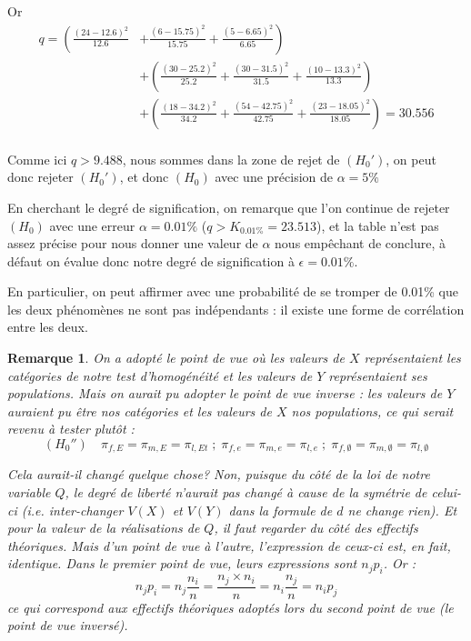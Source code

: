 \documentclass[a4paper,oneside,12pt]{article}
\theoremstyle{plain}
\newtheorem*{remark}{Remarque}
\begin{document}
\begin{enumerate}
    Or 
    \begin{align*}
        q = \left ( \frac{(24-12.6)^2}{12.6} \right. & +\left. \frac{(6-15.75)^2}{15.75}+\frac{(5-6.65)^2}{6.65} \right ) \\
        & + \left(\frac{(30-25.2)^2}{25.2}+\frac{(30-31.5)^2}{31.5}+\frac{(10-13.3)^2}{13.3}\right) \\
        & + \left(\frac{(18-34.2)^2}{34.2}+\frac{(54-42.75)^2}{42.75}+\frac{(23-18.05)^2}{18.05}\right)= 30.556\\
    \end{align*}


    Comme ici $q>9.488$, nous sommes dans la zone de rejet de $(H_0')$, on peut donc rejeter $(H_0')$, et donc $(H_0)$ avec une précision de $\alpha = 5\%$

    En cherchant le degré de signification, on remarque que l'on continue de rejeter $(H_0)$ avec une erreur $\alpha = 0.01\%$ ($q>K_{0.01\%} = 23.513$), et la table n'est pas assez précise pour nous donner une valeur de $\alpha$ nous empêchant de conclure, à défaut on évalue donc notre degré de signification à $\epsilon = 0.01\%$.

    En particulier, on peut affirmer avec une probabilité de se tromper de 0.01\% que les deux phénomènes ne sont pas indépendants : il existe une forme de corrélation entre les deux.

    \begin{remark}
        On a adopté le point de vue où les valeurs de $X$ représentaient les catégories de notre test d'homogénéité et les valeurs de $Y$ représentaient ses populations. Mais on aurait pu adopter le point de vue inverse : les valeurs de $Y$ auraient pu être nos catégories et les valeurs de $X$ nos populations, ce qui serait revenu à tester plutôt :
        $$(H_0'') \quad \pi_{f,E} = \pi_{m,E}= \pi_{l,Et}\; ; \;\pi_{f,e} = \pi_{m,e}= \pi_{l,e}\; ; \;\pi_{f,\emptyset} = \pi_{m,\emptyset}= \pi_{l,\emptyset}$$

        Cela aurait-il changé quelque chose? Non, puisque du côté de la loi de notre variable $Q$, le degré de liberté n'aurait pas changé à cause de la symétrie de celui-ci (i.e. inter-changer $V(X)$ et $V(Y)$ dans la formule de $d$ ne change rien). Et pour la valeur de la réalisations de $Q$, il faut regarder du côté des effectifs théoriques. Mais d'un point de vue à l'autre, l'expression de ceux-ci est, en fait, identique. Dans le premier point de vue, leurs expressions sont $n_j p_i$. Or : 
        $$ n_j p_i = n_j \frac{n_i}{n} = \frac{n_j \times n_i}{n} = n_i \frac{n_j}{n} = n_i p_j$$
        ce qui correspond aux effectifs théoriques adoptés lors du second point de vue (le point de vue inversé).


\end{remark}
\end{enumerate}
\end{document}
